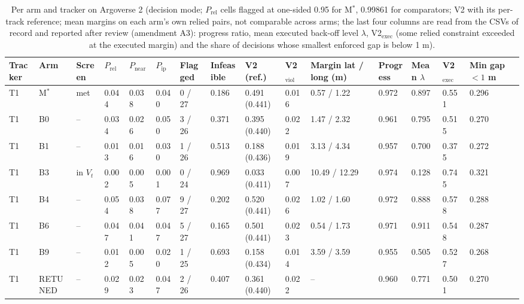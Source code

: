 \documentclass{ieeeaccess}
\begin{document}
\begin{table}[!t]
\centering
\caption{Per arm and tracker on Argoverse 2 (decision mode; $P_{\mathrm{rel}}$ cells flagged at one-sided 0.95 for M$^{*}$, 0.99861 for comparators; V2 with its per-track reference; mean margins on each arm's own relied pairs, not comparable across arms; the last four columns are read from the CSVs of record and reported after review (amendment A3): progress ratio, mean executed back-off level $\lambda$, V2$_{\mathrm{exec}}$ (some relied constraint exceeded at the executed margin) and the share of decisions whose smallest enforced gap is below 1 m).}
\label{tab:4}
\scriptsize
\setlength{\tabcolsep}{2pt}
\renewcommand{\arraystretch}{1.15}
\begin{tabular}{@{}L{0.061\textwidth}L{0.084\textwidth}L{0.053\textwidth}L{0.039\textwidth}L{0.046\textwidth}L{0.039\textwidth}L{0.061\textwidth}L{0.084\textwidth}L{0.090\textwidth}L{0.039\textwidth}L{0.088\textwidth}L{0.069\textwidth}L{0.039\textwidth}L{0.039\textwidth}L{0.051\textwidth}@{}}
\hline
Tracker & Arm & Screen & $P_{\mathrm{rel}}$ & $P_{\mathrm{near}}$ & $P_{\mathrm{ip}}$ & Flagged & Infeasible & V2 (ref.) & V2$_{\mathrm{viol}}$ & Margin lat / long (m) & Progress & Mean $\lambda$ & V2$_{\mathrm{exec}}$ & Min gap $< 1$ m \\
\hline
T1 & M$^{*}$ & met & 0.044 & 0.038 & 0.040 & 0 / 27 & 0.186 & 0.491 (0.441) & 0.016 & 0.57 / 1.22 & 0.972 & 0.897 & 0.551 & 0.296 \\
T1 & B0 & -- & 0.034 & 0.026 & 0.050 & 3 / 26 & 0.371 & 0.395 (0.440) & 0.022 & 1.47 / 2.32 & 0.961 & 0.795 & 0.515 & 0.270 \\
T1 & B1 & -- & 0.013 & 0.016 & 0.030 & 1 / 26 & 0.513 & 0.188 (0.436) & 0.019 & 3.13 / 4.34 & 0.957 & 0.700 & 0.375 & 0.272 \\
T1 & B3 & in $V_{t}$ & 0.002 & 0.005 & 0.001 & 0 / 24 & 0.969 & 0.033 (0.411) & 0.007 & 10.49 / 12.29 & 0.974 & 0.128 & 0.745 & 0.321 \\
T1 & B4 & -- & 0.054 & 0.038 & 0.077 & 9 / 27 & 0.202 & 0.520 (0.441) & 0.026 & 1.02 / 1.60 & 0.972 & 0.888 & 0.578 & 0.288 \\
T1 & B6 & -- & 0.047 & 0.041 & 0.047 & 5 / 27 & 0.165 & 0.501 (0.441) & 0.023 & 0.54 / 1.73 & 0.971 & 0.911 & 0.548 & 0.287 \\
T1 & B9 & -- & 0.012 & 0.005 & 0.020 & 1 / 25 & 0.693 & 0.158 (0.434) & 0.014 & 3.59 / 3.59 & 0.955 & 0.505 & 0.527 & 0.268 \\
T1 & RETUNED & -- & 0.029 & 0.023 & 0.047 & 2 / 26 & 0.407 & 0.361 (0.440) & 0.022 & -- & 0.960 & 0.771 & 0.501 & 0.270 \\

\end{tabular}
\end{table}
\end{document}
